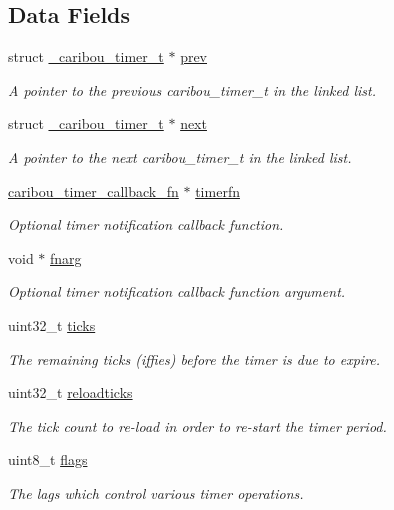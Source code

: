 \subsection*{Data Fields}
\begin{DoxyCompactItemize}
\item 
struct \hyperlink{struct__caribou__timer__t}{\-\_\-caribou\-\_\-timer\-\_\-t} $\ast$ \hyperlink{struct__caribou__timer__t_a711f3f84b0ef799261b12d7c0a6d4132}{prev}
\begin{DoxyCompactList}\small\item\em A pointer to the previous caribou\-\_\-timer\-\_\-t in the linked list. \end{DoxyCompactList}\item 
struct \hyperlink{struct__caribou__timer__t}{\-\_\-caribou\-\_\-timer\-\_\-t} $\ast$ \hyperlink{struct__caribou__timer__t_a922fab9a09a701c3ac7273c9548a4afa}{next}
\begin{DoxyCompactList}\small\item\em A pointer to the next caribou\-\_\-timer\-\_\-t in the linked list. \end{DoxyCompactList}\item 
\hyperlink{timer_8h_af991f5bbba685d64fd4a78090140228b}{caribou\-\_\-timer\-\_\-callback\-\_\-fn} $\ast$ \hyperlink{struct__caribou__timer__t_a036d01df45a585775dd0ef585f90eb7a}{timerfn}
\begin{DoxyCompactList}\small\item\em Optional timer notification callback function. \end{DoxyCompactList}\item 
void $\ast$ \hyperlink{struct__caribou__timer__t_a9276b37ed4a76264b1f8570b678abe42}{fnarg}
\begin{DoxyCompactList}\small\item\em Optional timer notification callback function argument. \end{DoxyCompactList}\item 
uint32\-\_\-t \hyperlink{struct__caribou__timer__t_a94c03a7c23a27aa378b861389b6ee0c8}{ticks}
\begin{DoxyCompactList}\small\item\em The remaining ticks (iffies) before the timer is due to expire. \end{DoxyCompactList}\item 
uint32\-\_\-t \hyperlink{struct__caribou__timer__t_a1b66f8c7abf7e00efa3d0adc916b0ecd}{reloadticks}
\begin{DoxyCompactList}\small\item\em The tick count to re-\/load in order to re-\/start the timer period. \end{DoxyCompactList}\item 
uint8\-\_\-t \hyperlink{struct__caribou__timer__t_a492a012c1141298c40a781c09ca86aed}{flags}
\begin{DoxyCompactList}\small\item\em The lags which control various timer operations. \end{DoxyCompactList}\end{DoxyCompactItemize}


